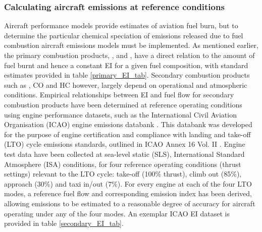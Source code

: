 \subsubsection{Calculating aircraft emissions at reference conditions}
Aircraft performance models provide estimates of aviation fuel burn, but to determine the particular chemical speciation of emissions released due to fuel combustion aircraft emissions models must be implemented. As mentioned earlier, the primary combustion products, ,  and , have a direct relation to the amount of fuel burnt and hence a constant EI for a given fuel composition, with standard estimates provided in table \ref{primary_EI_tab}. Secondary combustion products such as , CO and HC however, largely depend on operational and atmospheric conditions. Empirical relationships between EI and fuel flow for secondary combustion products have been determined at reference operating conditions using engine performance datasets, such as the International Civil Aviation Organisation (ICAO) engine emissions databank \cite{ICAOEEDB}.  This databank was developed for the purpose of engine certification and compliance with landing and take-off (LTO) cycle emissions standards, outlined in ICAO Annex 16 Vol. II \cite{ICAO2008}. Engine test data have been collected at sea-level static (SLS), International Standard Atmosphere (ISA) conditions, for four reference operating conditions (thrust settings) relevant to the LTO cycle: take-off (100\% thrust), climb out (85\%), approach (30\%) and taxi in/out (7\%). For every engine at each of the four LTO modes, a reference fuel flow and corresponding emission index has been derived, allowing emissions to be estimated to a reasonable degree of accuracy for aircraft operating under any of the four modes. An exemplar ICAO EI dataset is provided in table \ref{secondary_EI_tab}.




